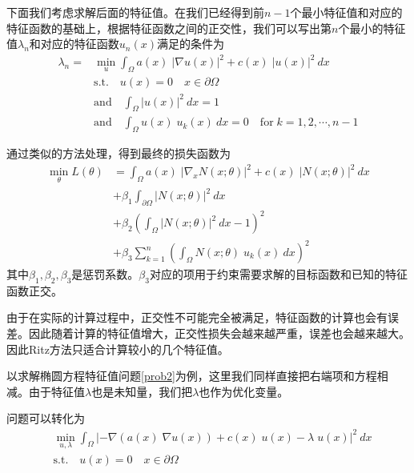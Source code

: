 下面我们考虑求解后面的特征值。在我们已经得到前$n-1$个最小特征值和对应的特征函数的基础上，根据特征函数之间的正交性，我们可以写出第$n$个最小的特征值$\lambda_n$和对应的特征函数$u_n(x)$满足的条件为
\begin{equation}
\begin{split}
\lambda_n = & \min_{u} \int_{\Omega} a(x) \; |\nabla u(x)|^2 + c(x) \; |u(x)|^2 \ dx \\
& \text{s.t.} \quad u(x) = 0 \quad x \in \partial \Omega \\
& \text{and} \quad \int_{\Omega} |u(x)|^2 \ dx = 1 \\
& \text{and} \quad \int_{\Omega} u(x) \; u_k(x) \ dx = 0 \quad \text{for} \; k = 1, 2, \cdots, n-1
\end{split}
\end{equation}

通过类似的方法处理，得到最终的损失函数为
\begin{equation}
\begin{split}
\min_{\theta} L(\theta) & = \int_{\Omega} a(x) \; |\nabla_x  N(x; \theta)|^2 + c(x) \; | N(x; \theta)|^2 \ dx \\
& + \beta_1 \int_{\partial \Omega} |N(x; \theta)|^2 \ dx \\
& + \beta_2 \left( \int_{\Omega} |N(x; \theta)|^2 \ dx - 1 \right)^2 \\
& + \beta_3 \sum_{k=1}^{n} \left( \int_{\Omega} N(x; \theta) \; u_k(x) \ dx \right)^2
\end{split}
\end{equation}
其中$\beta_1, \beta_2, \beta_3$是惩罚系数。$\beta_3$对应的项用于约束需要求解的目标函数和已知的特征函数正交。

由于在实际的计算过程中，正交性不可能完全被满足，特征函数的计算也会有误差。因此随着计算的特征值增大，正交性损失会越来越严重，误差也会越来越大。因此Ritz方法只适合计算较小的几个特征值。


以求解椭圆方程特征值问题\eqref{prob2}为例，这里我们同样直接把右端项和方程相减。由于特征值$\lambda$也是未知量，我们把$\lambda$也作为优化变量。

问题可以转化为
\begin{equation}
\begin{split}
& \min_{u, \lambda} \int_{\Omega} |-\nabla(a(x) \; \nabla u(x)) + c(x) \; u(x) - \lambda \; u(x)|^2 \ dx \\
& \text{s.t.} \quad u(x) = 0 \quad x \in \partial \Omega
\end{split}
\end{equation}

